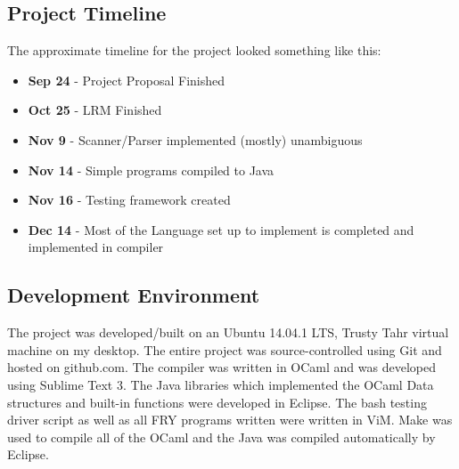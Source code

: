 \documentclass{article}
\begin{document}
\subsection{Project Timeline}
The approximate timeline for the project looked something like this:
\begin{itemize}
\item \textbf{Sep 24} - Project Proposal Finished
\item \textbf{Oct 25} - LRM Finished
\item \textbf{Nov 9} - Scanner/Parser implemented (mostly) unambiguous
\item \textbf{Nov 14} - Simple programs compiled to Java
\item \textbf{Nov 16} - Testing framework created
\item \textbf{Dec 14} - Most of the Language set up to implement is completed and implemented in compiler
\end{itemize}

\subsection{Development Environment}
The project was developed/built on an Ubuntu 14.04.1 LTS, Trusty Tahr virtual machine on my desktop. The entire project was source-controlled using Git and hosted on github.com. The compiler was written in OCaml and was developed using Sublime Text 3. The Java libraries which implemented the OCaml Data structures and built-in functions were developed in Eclipse. The bash testing driver script as well as all FRY programs written were written in ViM. Make was used to compile all of the OCaml and the Java was compiled automatically by Eclipse.
\end{document}
